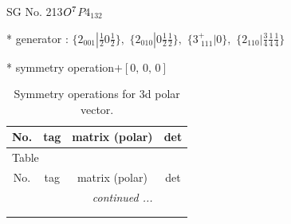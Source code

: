 \documentclass[fleqn,8pt]{jsarticle}
\begin{document}
\setcounter{MaxMatrixCols}{32}

\renewcommand{\tablename}{Table~}
\renewcommand{\figurename}{Figure~}
\begin{center}
\LARGE
SG No. 213\quad$O_{\rm }^{7}$\quad$P4_132$\quad[ cubic ]
\end{center}

* generator : $\{2{}_{001}|\frac{1}{2} 0 \frac{1}{2}\},\,\,\{2{}_{010}|0 \frac{1}{2} \frac{1}{2}\},\,\,\{3^{+}_{\,\,111}|0\},\,\,\{2{}_{110}|\frac{3}{4} \frac{1}{4} \frac{1}{4}\}$

* symmetry operation\quad$+\left[ 0,\, 0,\, 0 \right]$
\renewcommand{\arraystretch}{1.3}
\begin{longtable}{cccc}
\caption{Symmetry operations for 3d polar vector.}
 \\
 \hline \hline
No. & tag & matrix (polar) & det \\ \hline \endfirsthead

\multicolumn{3}{l}{\tablename\ \thetable{}} \\
 \hline \hline
No. & tag & matrix (polar) & det \\ \hline \endhead

 \hline \hline
\multicolumn{3}{r}{\footnotesize\it continued ...} \\ \endfoot

 \hline \hline
\multicolumn{3}{r}{} \\ \endlastfoot


\end{longtable}
\end{document}
